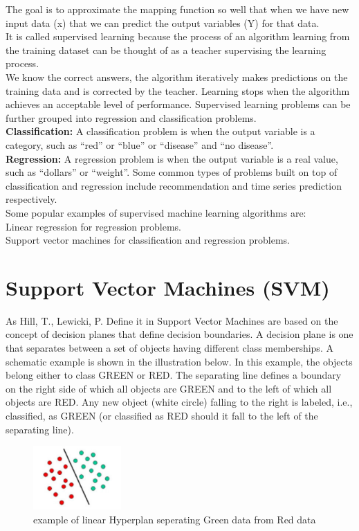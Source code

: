 The goal is to approximate the mapping function so well that when we have new input data (x) that we can predict the output variables (Y) for that data.\\It is called supervised learning because the process of an algorithm learning from the training dataset can be thought of as a teacher supervising the learning process.\\ We know the correct answers, the algorithm iteratively makes predictions on the training data and is corrected by the teacher. Learning stops when the algorithm achieves an acceptable level of performance.
Supervised learning problems can be further grouped into regression and classification problems.\\\textbf{Classification:} A classification problem is when the output variable is a category, such as “red” or “blue” or “disease” and “no disease”.\\ \textbf{Regression:}  A regression problem is when the output variable is a real value, such as “dollars” or “weight”.
Some common types of problems built on top of classification and regression include recommendation and time series prediction respectively.\\Some popular examples of supervised machine learning algorithms are:\\
Linear regression for regression problems.\\
Support vector machines for classification and regression problems.




\section{Support Vector Machines (SVM) }\label{sec:svm}
As Hill, T., Lewicki, P. Define it in \cite{svm} Support Vector Machines are based on the concept of decision planes that define decision boundaries. A decision plane is one that separates between a set of objects having different class memberships. A schematic example is shown in the illustration below. In this example, the objects belong either to class GREEN or RED. The separating line defines a boundary on the right side of which all objects are GREEN and to the left of which all objects are RED. Any new object (white circle) falling to the right is labeled, i.e., classified, as GREEN (or classified as RED should it fall to the left of the separating line).


\begin{figure}[H]
\centering
\includegraphics[width=0.3\textwidth]{img/svm1.png}
\caption{example of linear Hyperplan seperating Green data from Red data }
\label{122 }
\end{figure}


